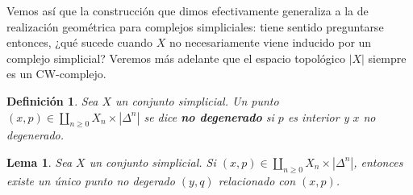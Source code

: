 \documentclass[11pt]{report}
\theoremstyle{colored}
\newtheorem{definition}{Definición}[section]
\newtheorem{lemma}{Lema}[section]
\renewcommand{\ss}[1]{\Delta^{#1}}
\begin{document}
Vemos así que la construcción que dimos efectivamente generaliza a la de realización geométrica para complejos simpliciales: tiene sentido preguntarse entonces, ¿qué sucede cuando $X$ no necesariamente viene inducido por un complejo simplicial? Veremos más adelante que el espacio topológico $|X|$ siempre es un CW-complejo.

\begin{definition} Sea $X$ un conjunto simplicial. Un punto $(x,p) \in \coprod_{n \geq 0} X_n \times |\ss{n}|$ se dice \textbf{no degenerado} si $p$ es interior y $x$ no degenerado.
\end{definition}

\begin{lemma}\label{uniq-pt-nodeg} Sea $X$ un conjunto simplicial. Si $(x,p) \in \coprod_{n \geq 0} X_n \times |\ss{n}|$, entonces existe un único punto no degerado $(y,q)$ relacionado con $(x,p)$.
\end{lemma}
\end{document}
